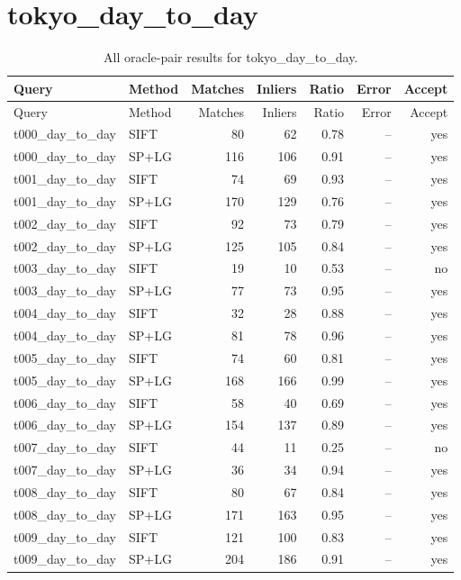 \section{tokyo\_day\_to\_day}
\begingroup\scriptsize\setlength{\tabcolsep}{3pt}
\begin{longtable}{llrrrrr}
\caption{All oracle-pair results for tokyo\_day\_to\_day.}\\
\toprule
Query & Method & Matches & Inliers & Ratio & Error & Accept\\\midrule\endfirsthead
\toprule Query & Method & Matches & Inliers & Ratio & Error & Accept\\\midrule\endhead
\bottomrule\endfoot
t000\_day\_to\_day & SIFT & 80 & 62 & 0.78 & -- & yes \\
t000\_day\_to\_day & SP+LG & 116 & 106 & 0.91 & -- & yes \\
t001\_day\_to\_day & SIFT & 74 & 69 & 0.93 & -- & yes \\
t001\_day\_to\_day & SP+LG & 170 & 129 & 0.76 & -- & yes \\
t002\_day\_to\_day & SIFT & 92 & 73 & 0.79 & -- & yes \\
t002\_day\_to\_day & SP+LG & 125 & 105 & 0.84 & -- & yes \\
t003\_day\_to\_day & SIFT & 19 & 10 & 0.53 & -- & no \\
t003\_day\_to\_day & SP+LG & 77 & 73 & 0.95 & -- & yes \\
t004\_day\_to\_day & SIFT & 32 & 28 & 0.88 & -- & yes \\
t004\_day\_to\_day & SP+LG & 81 & 78 & 0.96 & -- & yes \\
t005\_day\_to\_day & SIFT & 74 & 60 & 0.81 & -- & yes \\
t005\_day\_to\_day & SP+LG & 168 & 166 & 0.99 & -- & yes \\
t006\_day\_to\_day & SIFT & 58 & 40 & 0.69 & -- & yes \\
t006\_day\_to\_day & SP+LG & 154 & 137 & 0.89 & -- & yes \\
t007\_day\_to\_day & SIFT & 44 & 11 & 0.25 & -- & no \\
t007\_day\_to\_day & SP+LG & 36 & 34 & 0.94 & -- & yes \\
t008\_day\_to\_day & SIFT & 80 & 67 & 0.84 & -- & yes \\
t008\_day\_to\_day & SP+LG & 171 & 163 & 0.95 & -- & yes \\
t009\_day\_to\_day & SIFT & 121 & 100 & 0.83 & -- & yes \\
t009\_day\_to\_day & SP+LG & 204 & 186 & 0.91 & -- & yes \\

\end{longtable}

